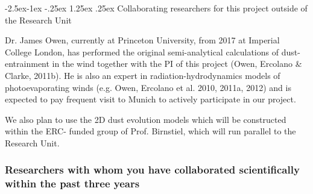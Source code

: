 \documentclass[10pt,fleqn,twoside]{article}
\makeatletter
\newcommand{\Tcol}{\color{blue}}
\renewcommand\paragraph{\@startsection{paragraph}{4}{\z@}%
            {-2.5ex\@plus -1ex \@minus -.25ex}%
            {1.25ex \@plus .25ex}%
            {\normalfont\normalsize\bfseries}}
\makeatother
\begin{document}
\paragraph{\Tcol Collaborating researchers for this project outside of
  the Research Unit}


Dr. James Owen, currently at Princeton University, from 2017 at
Imperial College London, has performed the original semi-analytical
calculations of dust-entrainment in the wind together with the PI of
this project (Owen, Ercolano \& Clarke, 2011b). He is also an expert
in radiation-hydrodynamics models of photoevaporating winds
(e.g. Owen, Ercolano et al. 2010, 2011a, 2012) and is expected to pay
frequent visit to Munich to actively participate in our project. 

We also plan to use the 2D dust evolution models which will be
constructed within the ERC- funded group of Prof. Birnstiel, which
will run parallel to the Research Unit. 

\subsubsection{\Tcol Researchers with whom you have collaborated scientifically within the past three years}

\end{document}
